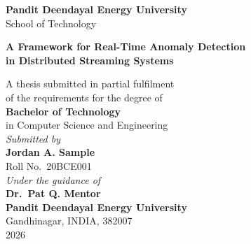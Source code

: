 \documentclass[12pt,a4paper,oneside]{report}
\newcommand{\thesisTitle}{A Framework for Real-Time Anomaly Detection\\in Distributed Streaming Systems}
\newcommand{\thesisAuthor}{Jordan A. Sample}
\newcommand{\thesisRollNo}{20BCE001}
\newcommand{\thesisGuide}{Dr.\ Pat Q. Mentor}
\newcommand{\thesisDepartment}{Computer Science and Engineering}
\newcommand{\thesisSchool}{School of Technology}
\newcommand{\thesisUniversity}{Pandit Deendayal Energy University}
\newcommand{\thesisCity}{Gandhinagar, INDIA, 382007}
\newcommand{\thesisDegree}{Bachelor of Technology}
\newcommand{\thesisYear}{2026}
\begin{document}
\pagestyle{plain}

\begin{titlepage}
  \centering
  \vspace*{0.5cm}


  \vspace{0.8cm}
  {\large \textbf{\thesisUniversity}}\\[0.2cm]
  {\normalsize \thesisSchool}\\[1.4cm]

  {\LARGE \bfseries \thesisTitle \par}
  \vspace{1.2cm}

  {\large A thesis submitted in partial fulfilment\\
   of the requirements for the degree of}\\[0.4cm]
  {\large \textbf{\thesisDegree}}\\[0.2cm]
  {\large in \thesisDepartment}\\[1.6cm]

  {\large \textit{Submitted by}}\\[0.3cm]
  {\Large \textbf{\thesisAuthor}}\\[0.15cm]
  {\large Roll No.\ \thesisRollNo}\\[1.6cm]

  {\large \textit{Under the guidance of}}\\[0.3cm]
  {\large \textbf{\thesisGuide}}\\[2.0cm]

  \vfill
  {\large \textbf{\thesisUniversity}}\\
  {\normalsize \thesisCity}\\[0.4cm]
  {\large \thesisYear}
\end{titlepage}
\end{document}
